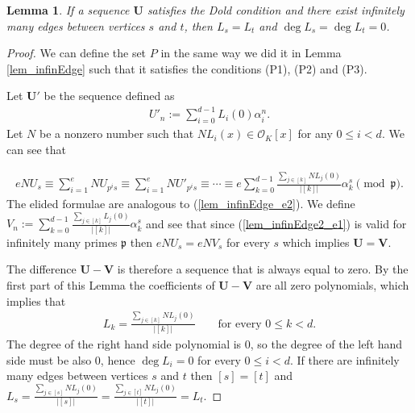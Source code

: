 \documentclass[preprint,12pt]{elsarticle}
\newcommand{\OO}{\mathcal{O}}
\newcommand{\pp}{\mathfrak{p} }
\newtheorem{lemma}{Lemma}
\begin{document}
\begin{lemma}\label{lem_infinEdge2}
    If a sequence ${\mathbf U}$ satisfies the Dold condition and there exist infinitely many edges between vertices $s$ and $t$, then $L_s=L_t$ and $\deg L_s = \deg L_t = 0$.
\end{lemma}
\begin{proof}
    We can define the set $P$ in the same way we did it in Lemma \ref{lem_infinEdge} such that it satisfies the conditions (P1), (P2) and (P3). 

    Let $\mathbf{U}'$ be the sequence defined as 
    \begin{align}
        U'_n := \sum_{i=0}^{d-1} L_i(0)\alpha^n_i .
    \end{align}
    Let $N$ be a nonzero number such that $NL_i(x)\in \OO_K[x]$ for any $0\leqslant i <d$. We can see that
    
    \begin{align}\label{lem_infinEdge2_e1}
        eN  U_s \equiv
        \sum_{i=1}^e N  U_{p^is} \equiv
        \sum_{i=1}^e N  U'_{p^is} \equiv \cdots \equiv%
        e\sum_{k=0}^{d-1} \frac{\sum_{j\in [k]}NL_j(0) }{|[k]|}  \alpha_k^s
        \pmod \pp.
    \end{align}
    The elided formulae are analogous to (\ref{lem_infinEdge_e2}). 
    We define ${V}_n := \sum_{k=0}^{d-1} \frac{\sum_{j\in [k]}L_j(0) }{|[k]|}  \alpha_k^s$ and see that since (\ref{lem_infinEdge2_e1}) is valid for infinitely many primes $\pp$ then $eN U_s = eN{V}_s$ for every $s$ which implies $\mathbf{U} = \mathbf{V}$.

    The difference $\mathbf{U} - \mathbf{V}$ is therefore a sequence that is always equal to zero. By the first part of this Lemma the coefficients of  $\mathbf{U} - \mathbf{V}$ are all zero polynomials, which implies that 
    \begin{align}
        L_k = \frac{\sum_{j\in [k]}NL_j(0) }{|[k]|}
        \quad\quad \text{for every $0\leqslant k < d$}.
    \end{align}
    The degree of the right hand side polynomial is 0, so the degree of the left hand side must be also 0, hence $\deg L_i = 0$ for every $0\leqslant i  < d$. 
    If there are infinitely many edges between vertices $s$ and $t$ then $[s] = [t]$ and $ L_s = \frac{\sum_{j\in [s]}NL_j(0) }{|[s]|} = \frac{\sum_{j\in [t]}NL_j(0) }{|[t]|} = L_t$.


\end{proof}
\end{document}
